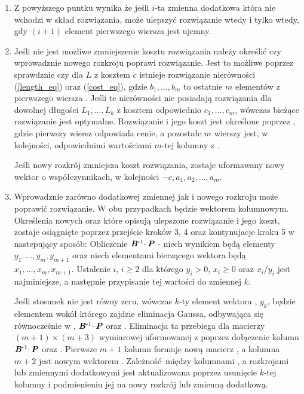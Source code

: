 \begin{enumerate}
\item Z powyższego puntku wynika że jeśli $i$-ta zmienna dodatkowa która nie wchodzi w skład rozwiązania, może ulepszyć rozwiązanie wtedy i tylko wtedy, gdy $(i+1)$ element pierwszego wiersza  jest ujemny.

\item Jeśli nie jest możliwe zmniejszenie kosztu rozwiązania należy określić czy wprowadznie nowego rozkroju poprawi rozwiązanie. Jest to możliwe poprzez sprawdznie czy dla $L$ z kosztem $c$ istnieje rozwiązanie nierówności (\ref{length_eq}) oraz (\ref{cost_eq}), gdzie $b_1,\dots,b_m$ to ostatnie $m$ elementów z pierwszego wiersza . Jeśli te nierówności nie posiadają rozwiązania dla dowolnej długości $L_1,\dots,L_k$ z kosztem odpowiednio $c_1,\dots,c_m$, wówczas bieżące rozwiązanie jest optymalne. Rozwiązanie i jego koszt jest określone poprzez , gdzie pierwszy wiersz odpowiada cenie, a pozostałe $m$ wierszy jest, w kolejności, odpowiednimi wartościami $m$-tej kolumny z .

Jeśli nowy rozkrój zmniejsza koszt rozwiązania, zostaje uformawany nowy wektor  o współczynnikach, w kolejności $-c,a_1,a_2,\dots,a_m$.

\item Wprowadznie zarówno dodatkowej zmiennej jak i nowego rozkroju może poprawić rozwiązanie. W obu przypadkach  będzie wektorem kolumnowym. Określenia nowych  oraz  które opisują ulepszone rozwiązanie i jego koszt, zostaje osiągnięte poprzez przejście kroków 3, 4 oraz kontynujacje kroku 5 w nastepujący sposób: Obliczenie $\textbf{\textit{B}}\textsuperscript{-1} \cdotp \textbf{\textit{P}}$ - niech wynikiem będą elementy $y_1,\dots,y_m,y_{m+1}$ oraz niech elementami bierzącego wektora  będą $x_1,\dots,x_m,x_{m+1}$. Ustalenie $i$, $ i \ge 2$ dla którego $y_i > 0$, $x_i \ge 0$ oraz $x_i/y_i$ jest najminiejsze, a następnie przypisanie tej wartości do zmiennej $k$.

Jeśli stosunek nie jest równy zeru, wówczas $k$-ty element wektora , $y_k$, będzie elementem wokół którego zajdzie eliminacja Gaussa, odbywająca się równocześnie w , $\textbf{\textit{B}}\textsuperscript{-1} \cdotp \textbf{\textit{P}}$ oraz . Eliminacja ta przebiega dla macierzy $(m+1) \times (m+3)$ wymiarowej  uformowanej z  poprzez dołączenie kolumn $\textbf{\textit{B}}\textsuperscript{-1} \cdotp \textbf{\textit{P}}$ oraz . Pierwsze $m+1$ kolumn  formuje nową macierz , a kolumna $m+2$ jest nowym wektorem . Zależność między kolumnami , a rozkrojami lub zmiennymi dodatkowymi jest aktualizowana poprzez usunięcie $k$-tej kolumny i podmienieniu jej na nowy rozkrój lub zmienną dodatkową.

\end{enumerate}

